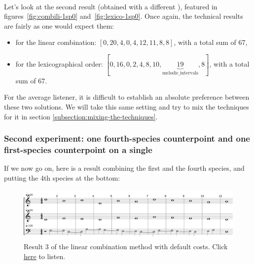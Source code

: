 \paragraph{}
Let's look at the second result (obtained with a different \cf), featured in figures~\ref{fig:combili-1sp0} and~\ref{fig:lexico-1sp0}.
Once again, the technical results are fairly as one would expect them:
\begin{itemize}
    \item for the linear combination: $[0, 20, 4, 0, 4, 12, 11, 8, 8]$, with a total sum of 67,
    \item for the lexicographical order: $ [0, 16, 0, 2, 4, 8, 10, \underset{\text{melodic\_intervals}}{\underbrace{19}}, 8]$, with a total sum of 67.
\end{itemize}
For the average listener, it is difficult to establish an absolute preference between these two solutions.
We will take this same setting and try to mix the techniques for it in section \ref{subsection:mixing-the-techniques}.

\subsubsection{Second experiment: one fourth-species counterpoint and one first-species counterpoint on a single \cf}

If we now go on, here is a result combining the first and the fourth species, and putting the 4th species at the bottom:
\begin{figure}[h]
    \centering
    \includegraphics[width=1\textwidth]{Images/Experiments/linear-combination-4sp.png}
    \caption{Result 3 of the linear combination method with default costs. Click \href{https://youtu.be/eunaKHOQ2Nk}{here} to listen.}
    \label{fig:combili-4sp}
\end{figure}

